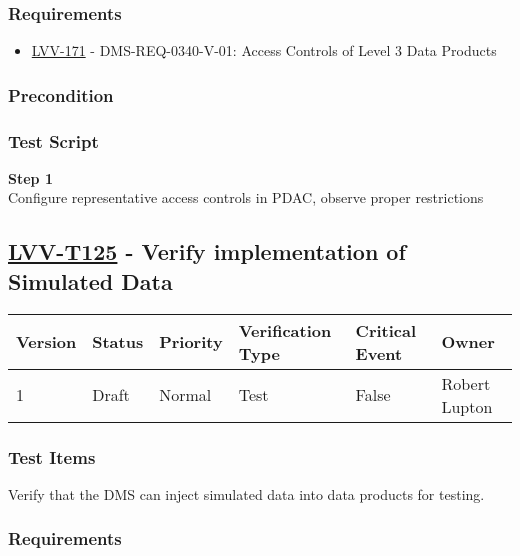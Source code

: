 \subsubsection{Requirements}\label{requirements-2}

\begin{itemize}
\tightlist
\item
  \href{https://jira.lsstcorp.org/browse/LVV-171}{LVV-171} -
  DMS-REQ-0340-V-01: Access Controls of Level 3 Data Products
\end{itemize}

\subsubsection{Precondition}\label{precondition}

\subsubsection{Test Script}\label{test-script-2}

\textbf{Step 1}\\
Configure representative access controls in PDAC, observe proper
restrictions\\[2\baselineskip]

\hypertarget{lvv-t125---verify-implementation-of-simulated-data}{\subsection{\texorpdfstring{\href{https://jira.lsstcorp.org/secure/Tests.jspa\#/testCase/LVV-T125}{LVV-T125}
- Verify implementation of Simulated
Data}{LVV-T125 - Verify implementation of Simulated Data}}\label{lvv-t125---verify-implementation-of-simulated-data}}

\begin{longtable}[]{@{}llllll@{}}
\toprule
Version & Status & Priority & Verification Type & Critical Event &
Owner\tabularnewline
\midrule
\endhead
1 & Draft & Normal & Test & False & Robert Lupton\tabularnewline
\bottomrule
\end{longtable}

\subsubsection{Test Items}\label{test-items-3}

Verify that the DMS can inject simulated data into data products for
testing.

\subsubsection{Requirements}\label{requirements-3}

